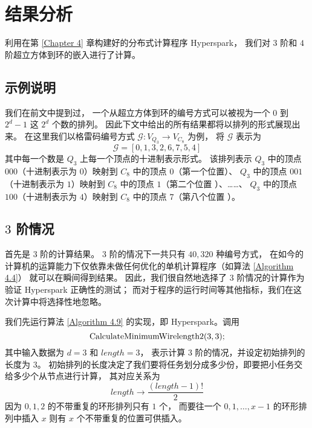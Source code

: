 
\chapter{结果分析}
\label{Chapter 5}

利用在第 \ref{Chapter 4} 章构建好的分布式计算程序 Hyperspark，
我们对 $3$ 阶和 $4$ 阶超立方体到环的嵌入进行了计算。

\section{示例说明}
\label{Section 5.1}

我们在前文中提到过，
一个从超立方体到环的编号方式可以被视为一个 $0$ 到 $2^d - 1$ 这 $2^d$ 个数的排列。
因此下文中给出的所有结果都将以排列的形式展现出来。
在这里我们以格雷码编号方式 $\mathcal{G} \colon V_{Q_3} \rightarrow V_{C_8}$ 为例，
将 $\mathcal{G}$ 表示为
\begin{equation*}
\mathcal{G} = [0, 1, 3, 2, 6, 7, 5, 4]
\end{equation*}
其中每一个数是 $Q_3$ 上每一个顶点的十进制表示形式。
该排列表示 $Q_3$ 中的顶点 $000$（十进制表示为 $0$）映射到 $C_8$ 中的顶点 $0$（第一个位置）、
$Q_3$ 中的顶点 $001$（十进制表示为 $1$）映射到 $C_8$ 中的顶点 $1$（第二个位置 ）、……、
$Q_3$ 中的顶点 $100$（十进制表示为 $4$）映射到 $C_8$ 中的顶点 $7$（第八个位置 ）。

\section{$3$ 阶情况}
\label{Section 5.2}

首先是 $3$ 阶的计算结果。
$3$ 阶的情况下一共只有 $40,320$ 种编号方式，
在如今的计算机的运算能力下仅依靠未做任何优化的单机计算程序（如算法 \ref{Algorithm 4.4}）
就可以在瞬间得到结果。
因此，我们很自然地选择了 $3$ 阶情况的计算作为验证 Hyperspark 正确性的测试；
而对于程序的运行时间等其他指标，我们在这次计算中将选择性地忽略。

我们先运行算法 \ref{Algorithm 4.9} 的实现，即 Hyperspark。调用
\begin{equation*}
\textnormal{CalculateMinimumWirelength2}(3, 3);
\end{equation*}
其中输入数据为 $d = 3$ 和 $length = 3$，
表示计算 $3$ 阶的情况，并设定初始排列的长度为 $3$。
初始排列的长度决定了我们要将任务划分成多少份，即要把小任务交给多少个从节点进行计算，
其对应关系为
\begin{equation*}
length \rightarrow \frac{(length - 1)!}{2}
\end{equation*}
因为 $0, 1, 2$ 的不带重复的环形排列只有 $1$ 个，
而要往一个 $0, 1, \dots, x - 1$ 的环形排列中插入 $x$ 则有 $x$ 个不带重复的位置可供插入。

